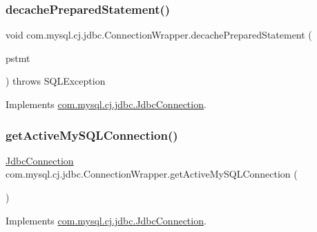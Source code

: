\subsubsection{\texorpdfstring{decache\+Prepared\+Statement()}{decachePreparedStatement()}}
{\footnotesize\ttfamily void com.\+mysql.\+cj.\+jdbc.\+Connection\+Wrapper.\+decache\+Prepared\+Statement (\begin{DoxyParamCaption}\item[{\mbox{\hyperlink{interfacecom_1_1mysql_1_1cj_1_1jdbc_1_1_jdbc_prepared_statement}{Jdbc\+Prepared\+Statement}}}]{pstmt }\end{DoxyParamCaption}) throws S\+Q\+L\+Exception}



Implements \mbox{\hyperlink{interfacecom_1_1mysql_1_1cj_1_1jdbc_1_1_jdbc_connection_abf867252ec91eb8d6ed6ec4fb34b2686}{com.\+mysql.\+cj.\+jdbc.\+Jdbc\+Connection}}.

\mbox{\label{classcom_1_1mysql_1_1cj_1_1jdbc_1_1_connection_wrapper_acc869cfc6c1bc921c9c1d46b4cd261b4}} 
\subsubsection{\texorpdfstring{get\+Active\+My\+S\+Q\+L\+Connection()}{getActiveMySQLConnection()}}
{\footnotesize\ttfamily \mbox{\hyperlink{interfacecom_1_1mysql_1_1cj_1_1jdbc_1_1_jdbc_connection}{Jdbc\+Connection}} com.\+mysql.\+cj.\+jdbc.\+Connection\+Wrapper.\+get\+Active\+My\+S\+Q\+L\+Connection (\begin{DoxyParamCaption}{ }\end{DoxyParamCaption})}



Implements \mbox{\hyperlink{interfacecom_1_1mysql_1_1cj_1_1jdbc_1_1_jdbc_connection_aa5b980c79d1c7d58535c5c469e3d4f24}{com.\+mysql.\+cj.\+jdbc.\+Jdbc\+Connection}}.

\mbox{\label{classcom_1_1mysql_1_1cj_1_1jdbc_1_1_connection_wrapper_ad356fedacaf160823158cc253f99322a}} 
